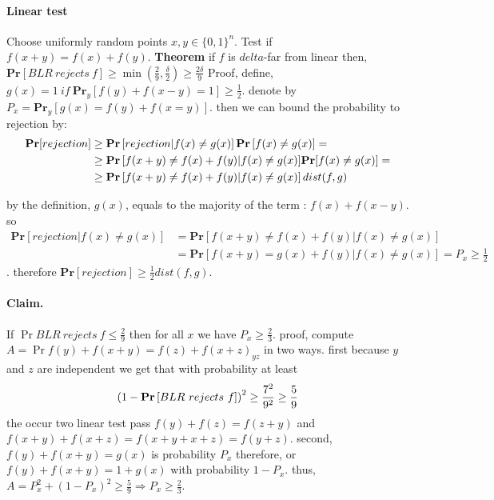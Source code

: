 \documentclass{article}
\begin{document}
\paragraph{ Linear test } Choose uniformly random points \(x,y \in \{0,1\}^n \). Test if \(f(x+y) = f(x) + f(y)\). \textbf{Theorem} if \(f\) is \(delta\)-far from linear then, \(\mathbf{Pr}[BLR \ rejects \ f ] \ge \min{ \left( \frac{2}{9}, \frac{\delta}{2} \right) } \ge \frac{2\delta}{9}  \) Proof, define, \(g(x) = 1 \ if \ \mathbf{Pr}_y[f(y) + f(x-y) = 1] \ge \frac{1}{2} \). denote by \( P_x = \mathbf{Pr}_y[g(x) =f(y)+f(x=y)] \). then we can bound the probability to rejection by:\[
\begin{split}
    \mathbf{Pr}[rejection]   &  \ge \mathbf{Pr}\left[ { rejection| f(x) \neq g(x)} \right] \mathbf{Pr}\left[ { f(x) \neq g(x) } \right] =  \\ &   \ge \mathbf{Pr}\left[ { f(x + y) \neq f(x) + f(y) | f(x) \neq g(x)]\mathbf{Pr}[f(x) \neq g(x) } \right] = \\ &   \ge \mathbf{Pr}\left[ { f(x + y) \neq f(x) + f(y) | f(x) \neq g(x)} \right]dist(f,g)  
\end{split}\]

by the definition, \(g(x)\), equals to the majority of the term : \(  f(x)  + f(x-y) \). so \[
\begin{split}
    \mathbf{Pr}[rejection| f(x) \neq g(x)] & = \mathbf{Pr}[f(x+y) \neq f(x) + f(y) | f(x) \neq g(x)]  \\ & =  \mathbf{Pr}[f(x+y) = g(x) + f(y) | f(x) \neq g(x)]  = P_x \ge \frac{1}{2} 
\end{split} \]. therefore \( \mathbf{Pr}[rejection] \ge \frac{1}{2} dist(f,g) \).  

\paragraph{Claim.} If \( \Pr{ BLR \ rejects \ f  } \le \frac{2}{9} \) then for all \(x\) we have \( P_x \ge \frac{2}{3} \). proof, compute \( A = \Pr{ f(y) + f(x+y) = f(z) + f(x+z) }_{yz} \) in two ways. first because \(y\) and \(z\) are independent we get that with probability at least \[\left(1 - \mathbf{Pr}\left[ { BLR \ rejects \ f  } \right]\right)^2 \ge \frac{7^2}{9^2} \ge \frac{5}{9} \] the occur two linear test pass \( f(y) + f(z) = f(z+y) \) and \( f(x+ y) + f(x+z) = f(x+ y + x+ z ) = f(y + z) \). second, \( f(y) + f(x+y) = g(x)\) is probability \( P_x \) therefore, or \( f(y) + f(x+y) = 1 + g(x)\) with  probability \( 1 - P_x \). thus, \( A = P_{x}^2 + (1-P_{x})^2 \ge \frac{5}{9} \Rightarrow P_x \ge \frac{2}{3} \).    
\end{document}
